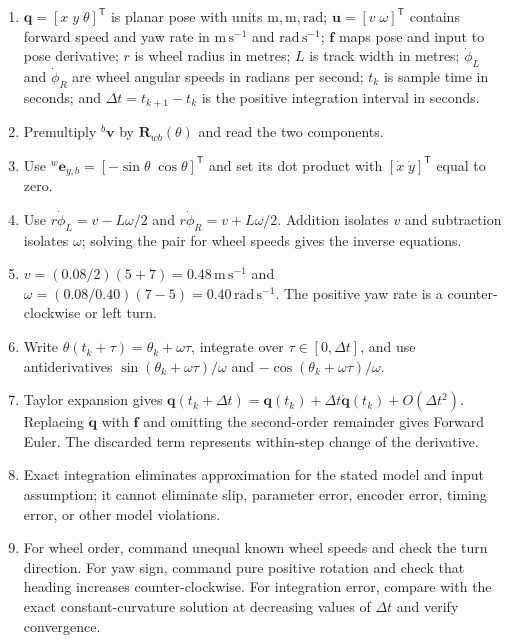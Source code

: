 \documentclass[
  australian,
  12pt,
  letterpaper,
  DIV=11,
  numbers=noendperiod,
  twoside]{scrreprt}
\providecommand{\tightlist}{%
  \setlength{\itemsep}{0pt}\setlength{\parskip}{0pt}}
\begin{document}
\begin{enumerate}
\def\labelenumi{\arabic{enumi}.}
\tightlist
\item
  \(\mathbf q=[x\;y\;\theta]^\mathsf T\) is planar pose with units
  \(\mathrm m,\mathrm m,\mathrm{rad}\);
  \(\mathbf u=[v\;\omega]^\mathsf T\) contains forward speed and yaw
  rate in \(\mathrm{m\,s^{-1}}\) and \(\mathrm{rad\,s^{-1}}\);
  \(\mathbf f\) maps pose and input to pose derivative; \(r\) is wheel
  radius in metres; \(L\) is track width in metres; \(\dot\phi_L\) and
  \(\dot\phi_R\) are wheel angular speeds in radians per second; \(t_k\)
  is sample time in seconds; and \(\Delta t=t_{k+1}-t_k\) is the
  positive integration interval in seconds.
\item
  Premultiply \({}^{b}\mathbf v\) by \(\mathbf R_{wb}(\theta)\) and read
  the two components.
\item
  Use \({}^{w}\mathbf e_{y,b}=[-\sin\theta\;\cos\theta]^\mathsf T\) and
  set its dot product with \([\dot x\;\dot y]^\mathsf T\) equal to zero.
\item
  Use \(r\dot\phi_L=v-L\omega/2\) and \(r\dot\phi_R=v+L\omega/2\).
  Addition isolates \(v\) and subtraction isolates \(\omega\); solving
  the pair for wheel speeds gives the inverse equations.
\item
  \(v=(0.08/2)(5+7)=0.48\,\mathrm{m\,s^{-1}}\) and
  \(\omega=(0.08/0.40)(7-5)=0.40\,\mathrm{rad\,s^{-1}}\). The positive
  yaw rate is a counter-clockwise or left turn.
\item
  Write \(\theta(t_k+\tau)=\theta_k+\omega\tau\), integrate over
  \(\tau\in[0,\Delta t]\), and use antiderivatives
  \(\sin(\theta_k+\omega\tau)/\omega\) and
  \(-\cos(\theta_k+\omega\tau)/\omega\).
\item
  Taylor expansion gives
  \(\mathbf q(t_k+\Delta t)=\mathbf q(t_k)+\Delta t\dot{\mathbf q}(t_k)+O(\Delta t^2)\).
  Replacing \(\dot{\mathbf q}\) with \(\mathbf f\) and omitting the
  second-order remainder gives Forward Euler. The discarded term
  represents within-step change of the derivative.
\item
  Exact integration eliminates approximation for the stated model and
  input assumption; it cannot eliminate slip, parameter error, encoder
  error, timing error, or other model violations.
\item
  For wheel order, command unequal known wheel speeds and check the turn
  direction. For yaw sign, command pure positive rotation and check that
  heading increases counter-clockwise. For integration error, compare
  with the exact constant-curvature solution at decreasing values of
  \(\Delta t\) and verify convergence.
\end{enumerate}
\end{document}
